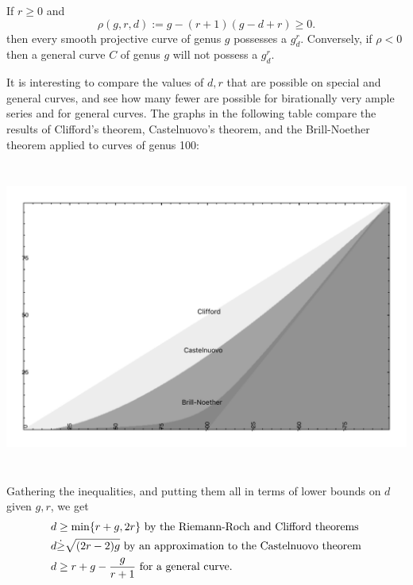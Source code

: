 \begin{theorem}\label{basic BN}
If $r\geq 0$ and
 $$
 \rho(g,r,d) := g - (r+1)(g-d+r) \geq 0.
$$
then every smooth projective curve of genus $g$  possesses a $g^r_d$. Conversely, if $\rho < 0$ then a general curve $C$ of genus $g$ will not possess a $g^r_d$.
\end{theorem}


It is interesting to compare the values of $d,r$ that are possible on special and general curves, and see how many fewer are possible for birationally very ample series and for general curves. The graphs in the following table compare the results of 
Clifford's theorem, Castelnuovo's theorem, and the Brill-Noether theorem applied to curves
of genus 100:

\centerline{ \includegraphics[height=4in]{"Clifford-Castelnuovo-Brill-Noether"}}

Gathering the inequalities, and putting them all in terms of lower bounds on $d$ given $g, r$,
we get \goodbreak
\begin{align*}
 d &\geq \min\{r+g, 2r\} \hbox{ by the Riemann-Roch and Clifford theorems}\\
 d &\dot\geq \sqrt{(2r-2)g} \hbox{ by an approximation to the Castelnuovo theorem}\\
 d &\geq r+g-\frac{g}{r+1} \hbox{ for a general curve.}
\end{align*}

